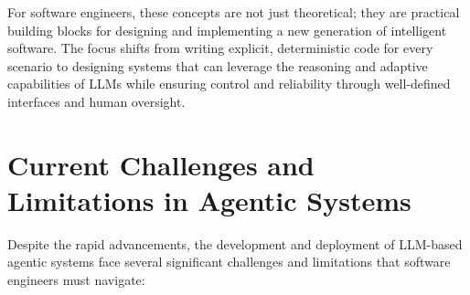 For software engineers, these concepts are not just theoretical; they are practical building blocks for designing and implementing a new 
generation of intelligent software. The focus shifts from writing explicit, deterministic code for every scenario to designing systems that 
can leverage the reasoning and adaptive capabilities of LLMs while ensuring control and reliability through well-defined interfaces and human oversight.

\section{Current Challenges and Limitations in Agentic Systems}

Despite the rapid advancements, the development and deployment of LLM-based agentic systems face several significant challenges and 
limitations that software engineers must navigate:

